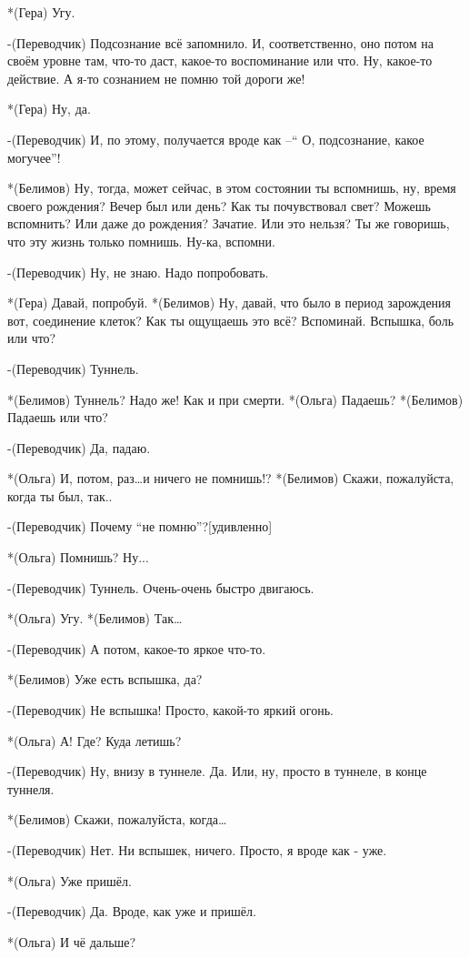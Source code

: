 *(Гера) Угу.

-(Переводчик) Подсознание всё запомнило. И, соответственно, оно потом на своём уровне там, что-то даст, какое-то воспоминание или что. Ну, какое-то действие. А  я-то сознанием  не помню той дороги же!

*(Гера) Ну, да.

-(Переводчик) И, по этому, получается вроде как –“ О, подсознание, какое могучее”! 

*(Белимов) Ну, тогда, может сейчас, в этом состоянии ты вспомнишь, ну, время своего рождения? Вечер был или день? Как ты почувствовал свет? Можешь вспомнить? Или даже до рождения? Зачатие. Или это нельзя? Ты же говоришь, что эту жизнь только помнишь. Ну-ка, вспомни.

-(Переводчик) Ну, не знаю.  Надо попробовать. 

*(Гера) Давай, попробуй.
*(Белимов) Ну, давай, что было в период зарождения вот, соединение клеток? Как ты ощущаешь это всё? Вспоминай. Вспышка, боль или что?

-(Переводчик) Туннель.

*(Белимов) Туннель? Надо же! Как и при смерти.
*(Ольга) Падаешь?
*(Белимов) Падаешь или что?

-(Переводчик) Да, падаю.

*(Ольга) И, потом, раз…и ничего не помнишь!?
*(Белимов) Скажи, пожалуйста, когда ты был, так.. 

-(Переводчик) Почему “не помню”?[удивленно]

*(Ольга) Помнишь? Ну...

-(Переводчик) Туннель. Очень-очень быстро двигаюсь.

*(Ольга) Угу.
*(Белимов) Так…

-(Переводчик) А потом, какое-то яркое что-то.

*(Белимов) Уже есть вспышка, да?

-(Переводчик) Не вспышка! Просто, какой-то яркий огонь.

*(Ольга) А! Где? Куда летишь?

-(Переводчик) Ну, внизу в туннеле. Да. Или, ну, просто в туннеле, в конце туннеля.

*(Белимов) Скажи, пожалуйста, когда…

-(Переводчик) Нет. Ни вспышек, ничего. Просто, я вроде как - уже.

*(Ольга) Уже пришёл.

-(Переводчик) Да. Вроде, как уже и пришёл.

*(Ольга) И чё дальше?

